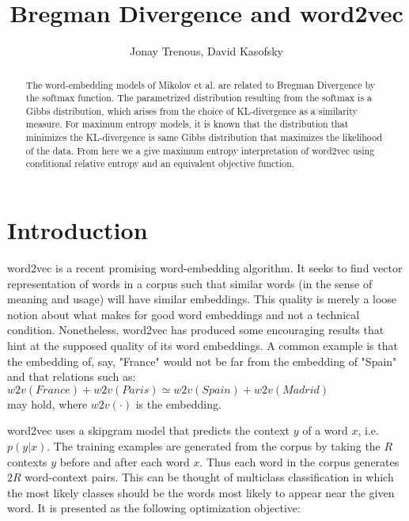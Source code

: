 \documentclass[]{article}
\title{Bregman Divergence and word2vec}
\author{Jonay Trenous, David Kasofsky}
\begin{document}
\maketitle

\begin{abstract}

\noindent The word-embedding models of Mikolov et al.\cite{word2vec1}\cite{word2vec2} are related to Bregman Divergence by the softmax function. The parametrized distribution resulting from the softmax is a Gibbs distribution, which arises from the choice of KL-divergence as a similarity measure. For maximum entropy models, it is known that the distribution that minimizes the KL-divergence is same Gibbs distribution that maximizes the likelihood of the data. From here we a give maximum entropy interpretation of word2vec using conditional relative entropy and an equivalent objective function.

\end{abstract}

\section{Introduction}

word2vec\cite{word2vec1}\cite{word2vec2} is a recent promising word-embedding algorithm. It seeks to find vector representation of words in a corpus such that similar words (in the sense of meaning and usage) will have similar embeddings. This quality is merely a loose notion about what makes for good word embeddings and not a technical condition. Nonetheless, word2vec has produced some encouraging results\cite{dummy} that hint at the supposed quality of its word embeddings. A common example is that the embedding of, say, "France" would not be far from the embedding of "Spain"\cite{dummy} and that relations such as:\\

$w2v(France) + w2v(Paris) \simeq w2v(Spain) + w2v(Madrid)$\\

\noindent may hold, where $w2v(\cdot)$ is the embedding.

word2vec uses a skipgram model that predicts the context $y$ of a word $x$, i.e. $p(y|x)$. The training examples are generated from the corpus by taking the $R$ contexts $y$ before and after each word $x$. Thus each word in the corpus generates $2R$ word-context pairs. This can be thought of multiclass classification in which the most likely classes should be the words most likely to appear near the given word. It is presented as the following optimization objective:\\
\end{document}
